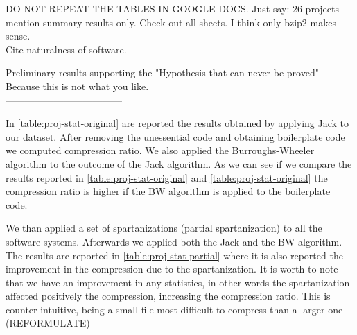 
DO NOT REPEAT THE TABLES IN GOOGLE DOCS.
Just say: 26 projects mention summary results only.
Check out all sheets. I think only bzip2 makes sense.\\

Cite naturalness of software.

Preliminary results supporting the 
"Hypothesis that can never be proved"
Because this is not what you like.\\

------------------------------------

In \cref{table:proj-stat-original} are reported the results obtained by applying Jack to our dataset. 
After removing the unessential code and obtaining boilerplate code we computed compression ratio. 
We also applied the Burroughs-Wheeler algorithm to the outcome of the Jack algorithm.
As we can see if we compare the results reported in \cref{table:proj-stat-original}
and \cref{table:proj-stat-original} the compression ratio is higher if the BW algorithm
is applied to the boilerplate code.

\begin{table}
\centering
{}
\label{table:proj-stat-original}
\caption{The results of the compression using the Jack algorithm alone and both Jack and 
Burroughs-Wheeler algorithms combined.}
\end{table}

We than applied a set of spartanizations (partial spartanization) to all the
software systems.  Afterwards we applied both the Jack and the BW algorithm.
The results are reported in \cref{table:proj-stat-partial} where it is also
reported the improvement in the compression due to the spartanization.  It is
worth to note that we have an improvement in any statistics, in other words the
spartanization affected positively the compression, increasing the compression
ratio.  This is counter intuitive, being a small file most difficult to
compress than a larger one (REFORMULATE)

